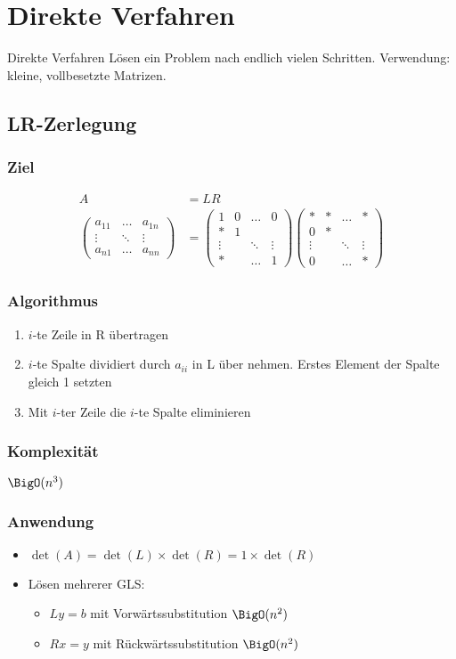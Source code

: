 \section{Direkte Verfahren}
Direkte Verfahren Lösen ein Problem nach endlich vielen Schritten. Verwendung: kleine, vollbesetzte Matrizen.
\subsection{LR-Zerlegung}
\subsubsection{Ziel}
\begin{align*}
	A &= LR \\
	\begin{pmatrix}
		a_{11} & \dots & a_{1n} \\
		\vdots & \ddots & \vdots \\
		a_{n1} & \dots & a_{nn}
	\end{pmatrix} &= \begin{pmatrix}
		1 & 0 & \dots & 0 \\
		* & 1 \\
		\vdots &  & \ddots & \vdots\\
		* & & \dots & 1
	\end{pmatrix} \begin{pmatrix}
		* & * & \dots & * \\
		0 & * \\
		\vdots &  & \ddots & \vdots\\
		0 & & \dots & *
	\end{pmatrix}
\end{align*}
\subsubsection{Algorithmus}
\begin{enumerate}
	\item $i$-te Zeile in R übertragen
	\item $i$-te Spalte dividiert durch $a_{ii}$ in L über nehmen. Erstes Element der Spalte gleich 1 setzten 
	\item Mit $i$-ter Zeile die $i$-te Spalte eliminieren 
\end{enumerate}
\subsubsection{Komplexität}
$\BigO(n^3)$
\subsubsection{Anwendung}
\begin{itemize}
	\item $\det(A)=\det(L)\times\det(R)=1\times\det(R)$
	\item Lösen mehrerer GLS:
		\begin{itemize}
			\item $Ly=b$ mit Vorwärtssubstitution $\BigO(n^2)$
			\item $Rx=y$ mit Rückwärtssubstitution $\BigO(n^2)$
		\end{itemize}
\end{itemize}

